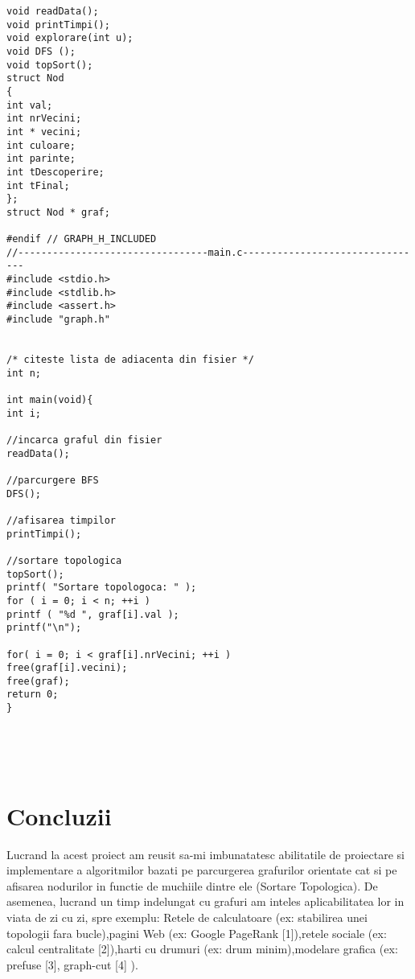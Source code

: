 \documentclass[14pt]{article}
\begin{document}
\begin{lstlisting}
void readData();
void printTimpi();
void explorare(int u);
void DFS ();
void topSort();
struct Nod
{
int val;
int nrVecini;
int * vecini;
int culoare;
int parinte;
int tDescoperire;
int tFinal;
};
struct Nod * graf;

#endif // GRAPH_H_INCLUDED
//---------------------------------main.c--------------------------------
#include <stdio.h>
#include <stdlib.h>
#include <assert.h>
#include "graph.h"


/* citeste lista de adiacenta din fisier */
int n;

int main(void){
int i;

//incarca graful din fisier
readData();

//parcurgere BFS
DFS();

//afisarea timpilor
printTimpi();

//sortare topologica
topSort();
printf( "Sortare topologoca: " );
for ( i = 0; i < n; ++i )
printf ( "%d ", graf[i].val );
printf("\n");

for( i = 0; i < graf[i].nrVecini; ++i )
free(graf[i].vecini);
free(graf);
return 0;
}





\end{lstlisting}

\newpage

\vspace{40 mm}
\section*{Concluzii}
\vspace{20 mm}
Lucrand la acest proiect am reusit sa-mi imbunatatesc abilitatile de proiectare si implementare a algoritmilor bazati pe parcurgerea grafurilor orientate cat si pe afisarea nodurilor in functie de muchiile dintre ele (Sortare Topologica). De asemenea, lucrand un timp indelungat cu grafuri am inteles aplicabilitatea lor in viata de zi cu zi, spre exemplu: Retele de calculatoare (ex: stabilirea unei topologii fara bucle),pagini Web (ex: Google PageRank [1]),retele sociale (ex: calcul centralitate [2]),harti cu drumuri (ex: drum minim),modelare grafica (ex: prefuse [3], graph-cut [4] ).
\\\vspace{20mm}
\newpage
\end{document}
